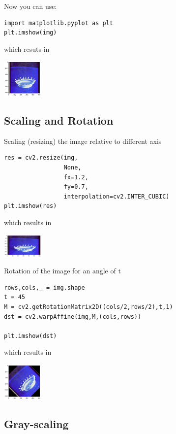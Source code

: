 Now you can use:

\begin{verbatim}
import matplotlib.pyplot as plt
plt.imshow(img)
\end{verbatim}

which resuts in 

\includegraphics[width=0.15\textwidth]{opencv_files/output_5_1.png}


\subsection{Scaling and Rotation}\label{scaling-and-rotation}

Scaling (resizing) the image relative to different axis

\begin{verbatim}
res = cv2.resize(img,
                 None,
                 fx=1.2, 
                 fy=0.7, 
                 interpolation=cv2.INTER_CUBIC)
plt.imshow(res)
\end{verbatim}

which results in 

\includegraphics[width=0.15\textwidth]{opencv_files/output_7_1.png}


Rotation of the image for an angle of t

\begin{verbatim}
rows,cols,_ = img.shape
t = 45
M = cv2.getRotationMatrix2D((cols/2,rows/2),t,1)
dst = cv2.warpAffine(img,M,(cols,rows))

plt.imshow(dst)
\end{verbatim}

which results in 

\includegraphics[width=0.15\textwidth]{opencv_files/output_9_1.png}

\subsection{Gray-scaling}\label{gray-scaling}

